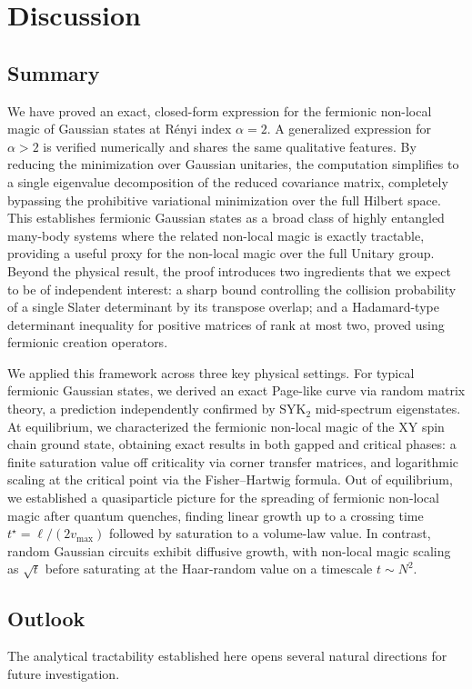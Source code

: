 \documentclass[prx,twocolumn,superscriptaddress,aps,10pt, frontmatterverbose, reprint,footinbib,longbibliography=true]{revtex4-2}
\newcommand{\RENYI}{\alpha}
\begin{document}
\section{Discussion}

\subsection{Summary}
We have proved an exact, closed-form expression for the fermionic non-local magic of Gaussian states at R\'enyi index $\RENYI=2$. A generalized expression for $\RENYI>2$ is verified numerically and shares the same qualitative features.
By reducing the minimization over Gaussian unitaries, the computation simplifies to a single eigenvalue decomposition of the reduced covariance matrix, completely bypassing the prohibitive variational minimization over the full Hilbert space. This establishes fermionic Gaussian states as a broad class of highly entangled many-body systems where the related non-local magic is exactly tractable, providing a useful proxy for the non-local magic over the full Unitary group.
Beyond the physical result, the proof introduces two ingredients that we expect to be of independent interest: a sharp bound controlling the collision probability of a single Slater determinant by its transpose overlap; and a Hadamard-type determinant inequality for positive matrices of rank at most two, proved using fermionic creation operators.


We applied this framework across three key physical settings.
For typical fermionic Gaussian states, we derived an exact Page-like curve via random matrix theory, a prediction independently confirmed by SYK$_2$ mid-spectrum eigenstates.
At equilibrium, we characterized the fermionic non-local magic of the XY spin chain ground state, obtaining exact results in both gapped and critical phases: a finite saturation value off criticality via corner transfer matrices, and logarithmic scaling at the critical point via the Fisher--Hartwig formula.
Out of equilibrium, we established a quasiparticle picture for the spreading of fermionic non-local magic after quantum quenches, finding linear growth up to a crossing time $t^\star= \ell/(2v_\mathrm{max})$  followed by saturation to a volume-law value.
In contrast, random Gaussian circuits exhibit diffusive growth, with non-local magic scaling as $\sqrt{t}$ before saturating at the Haar-random value on a timescale $t\sim N^2$.


\subsection{Outlook}
The analytical tractability established here opens several natural directions for future investigation.
\end{document}

